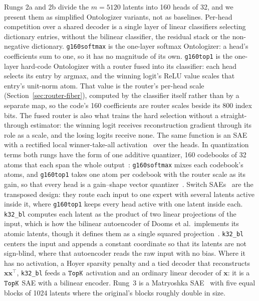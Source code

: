 Rungs 2a and 2b divide the $m{=}5120$ latents into 160 heads of 32, and
we present them as simplified Ontologizer variants, not as baselines.
Per-head competition over a shared decoder is a single layer of linear
classifiers selecting dictionary entries, without the bilinear
classifier, the residual stack or the non-negative dictionary.
\texttt{g160softmax} is the one-layer softmax Ontologizer: a head's
coefficients sum to one, so it has no magnitude of its own.
\texttt{g160top1} is the one-layer hard-code Ontologizer with a router
fused into its classifier: each head selects its entry by argmax, and the
winning logit's ReLU value scales that entry's unit-norm atom. That value
is the router's per-head scale (Section~\ref{sec:router-fiber}), computed
by the classifier itself rather than by a separate map, so the code's 160
coefficients are router scales beside its 800 index bits. The fused
router is also what trains the hard selection without a straight-through
estimator: the winning logit receives reconstruction gradient through its
role as a scale, and the losing logits receive none. The same function is
an SAE with a rectified local winner-take-all
activation~\cite{srivastava2013} over the heads. In quantization terms
both rungs have the form of one additive quantizer, 160 codebooks of 32
atoms that each span the whole output~\cite{babenko2014}:
\texttt{g160softmax} mixes each codebook's atoms, and \texttt{g160top1}
takes one atom per codebook with the router scale as its gain, so that
every head is a gain--shape vector quantizer~\cite{aharon2006}. Switch
SAEs~\cite{mudide2025} are the transposed design: they route each input
to one expert with several latents active inside it, where
\texttt{g160top1} keeps every head active with one latent inside each.
\texttt{k32\_bl} computes each latent as the product of two linear
projections of the input, which is how the bilinear autoencoder of
Dooms et al.\ implements its atomic latents, though it defines them as a
single squared projection~\cite{dooms2026}. \texttt{k32\_bl} centers the
input and appends a constant coordinate so that its latents are not
sign-blind, where that autoencoder reads the raw input with no bias.
Where it has no activation, a Hoyer sparsity penalty and a tied decoder
that reconstructs $\mathbf{x}\mathbf{x}^\top$, \texttt{k32\_bl} feeds a
$\mathop{\mathtt{TopK}}\limits$ activation and an ordinary linear decoder of $\mathbf{x}$: it is
a $\mathop{\mathtt{TopK}}\limits$ SAE with a bilinear encoder.
Rung~3 is a Matryoshka SAE~\cite{bussmann2025} with five equal blocks of
1024 latents where the original's blocks roughly double in size.

